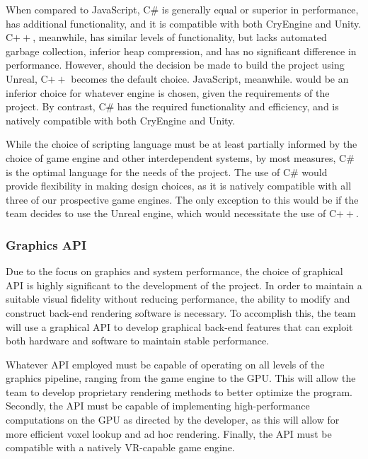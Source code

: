 \documentclass[onecolumn, draftclsnofoot,10pt, compsoc]{IEEEtran}
\newcounter{threesection}[subsubsection]
\begin{document}
When compared to JavaScript, C\# is generally equal or superior in performance, has additional functionality, and it is compatible with both CryEngine and Unity. C$++$, meanwhile, has similar levels of functionality, but lacks automated garbage collection, inferior heap compression, and has no significant difference in performance. However, should the decision be made to build the project using Unreal, C$++$ becomes the default choice. JavaScript, meanwhile. would be an inferior choice for whatever engine is chosen, given the requirements of the project. By contrast, C\# has the required functionality and efficiency, and is natively compatible with both CryEngine and Unity. 

While the choice of scripting language must be at least partially informed by the choice of game engine and other interdependent systems, by most measures, C\# is the optimal language for the needs of the project. The use of C\# would provide flexibility in making design choices, as it is natively compatible with all three of our prospective game engines. The only exception to this would be if the team decides to use the Unreal engine, which would necessitate the use of C$++$.

\subsubsection{Graphics API}

Due to the focus on graphics and system performance, the choice of graphical API is highly significant to the development of the project. In order to maintain a suitable visual fidelity without reducing performance, the ability to modify and construct back-end rendering software is necessary. To accomplish this, the team will use a graphical API to develop graphical back-end features that can exploit both hardware and software to maintain stable performance.

Whatever API employed must be capable of operating on all levels of the graphics pipeline, ranging from the game engine to the GPU. This will allow the team to develop proprietary rendering methods to better optimize the program. Secondly, the API must be capable of implementing high-performance computations on the GPU as directed by the developer, as this will allow for more efficient voxel lookup and ad hoc rendering. Finally, the API must be compatible with a natively VR-capable game engine.
\end{document}
